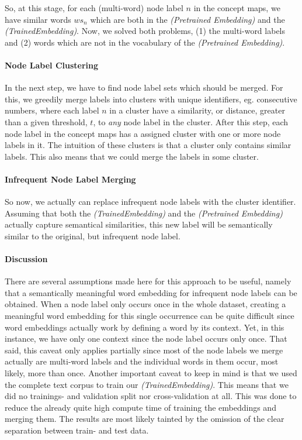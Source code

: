 So, at this stage, for each (multi-word) node label $n$ in the concept maps, we have similar words $ws_n$ which are both in the \textit{(Pretrained Embedding)} and the \textit{(TrainedEmbedding)}.
Now, we solved both problems, (1) the multi-word labels and (2) words which are not in the vocabulary of the \textit{(Pretrained Embedding)}.

\paragraph{Node Label Clustering}
In the next step, we have to find node label sets which should be merged.
For this, we greedily merge labels into clusters with unique identifiers, eg. consecutive numbers, where each label $n$ in a cluster have a similarity, or distance, greater than a given threshold, $t$, to \textit{any} node label in the cluster.
After this step, each node label in the concept maps has a assigned cluster with one or more node labels in it.
The intuition of these clusters is that a cluster only contains similar labels.
This also means that we could merge the labels in some cluster.

\paragraph{Infrequent Node Label Merging}
So now, we actually can replace infrequent node labels with the cluster identifier.
Assuming that both the \textit{(TrainedEmbedding)} and the \textit{(Pretrained Embedding)} actually capture semantical similarities, this new label will be semantically similar to the original, but infrequent node label.

\paragraph{Discussion}
There are several assumptions made here for this approach to be useful, namely that a semantically meaningful word embedding for infrequent node labels can be obtained.
When a node label only occurs once in the whole dataset, creating a meaningful word embedding for this single occurrence can be quite difficult since word embeddings actually work by defining a word by its context.
Yet, in this instance, we have only one context since the node label occurs only once.
That said, this caveat only applies partially since most of the node labels we merge actually are multi-word labels and the individual words in them occur, most likely, more than once.
Another important caveat to keep in mind is that we used the complete text corpus to train our \textit{(TrainedEmbedding)}.
This means that we did no trainings- and validation split nor cross-validation at all.
This was done to reduce the already quite high compute time of training the embeddings and merging them.
The results are most likely tainted by the omission of the clear separation between train- and test data.

